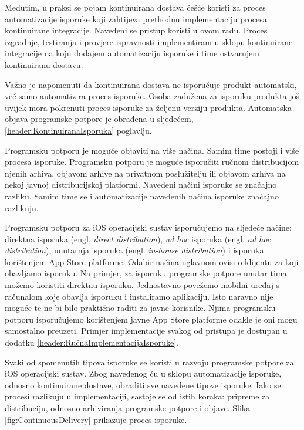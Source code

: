 \documentclass[times, utf8, diplomski, numeric]{fer}
\newcommand{\eng}[1]{(engl. \textit{#1})}
\begin{document}
Međutim, u praksi se pojam kontinuirana dostava češće koristi za proces automatizacije isporuke koji zahtijeva prethodnu implementaciju procesa kontinuirane integracije. Navedeni se pristup koristi u ovom radu. Proces izgradnje, testiranja i provjere ispravnosti implementiram u sklopu kontinuirane integracije na koju dodajem automatizaciju isporuke i time ostvarujem kontinuiranu dostavu.

Važno je napomenuti da kontinuirana dostava ne isporučuje produkt automatski, već samo automatizira proces isporuke. Osoba zadužena za isporuku produkta još uvijek mora pokrenuti proces isporuke za željenu verziju produkta. Automatska objava programske potpore je obrađena u sljedećem, \ref{header:KontinuiranaIsporuka} poglavlju.

Programsku potporu je moguće objaviti na više načina. Samim time postoji i više procesa isporuke. Programsku potporu je moguće isporučiti ručnom distribucijom njenih arhiva, objavom arhive na privatnom poslužitelju ili objavom arhiva na nekoj javnoj distribucijskoj platformi. Navedeni načini isporuke se značajno razliku. Samim time se i automatizacije navedenih načina isporuke značajno razlikuju.

Programsku potporu za iOS operacijski sustav isporučujemo na sljedeće načine: direktna isporuka \eng{direct distribution}, \textit{ad hoc} isporuka \eng{ad hoc distribution}, unutarnja isporuka \eng{in-house distribution} i isporuka korištenjem App Store platforme. Odabir načina uglavnom ovisi o klijentu za koji obavljamo isporuku. Na primjer, za isporuku programske potpore unutar tima možemo koristiti direktnu isporuku. Jednostavno povežemo mobilni uređaj s računalom koje obavlja isporuku i instaliramo aplikaciju. Isto naravno nije moguće te ne bi bilo praktično raditi za javne korisnike. Njima programsku potporu isporučujemo korištenjem javne App Store platforme odakle je oni mogu samostalno preuzeti. Primjer implementacije svakog od pristupa je dostupan u dodatku \ref{header:RučnaImplementacijaIsporuke}.

Svaki od spomenutih tipova isporuke se koristi u razvoju programske potpore za iOS operacijski sustav. Zbog navedenog ću u sklopu automatizacije isporuke, odnosno kontinuirane dostave, obraditi sve navedene tipove isporuke. Iako se procesi razlikuju u implementaciji, sastoje se od istih koraka: pripreme za distribuciju, odnosno arhiviranja programske potpore i objave. Slika \ref{fig:ContinuousDelivery} prikazuje proces isporuke.
\end{document}
